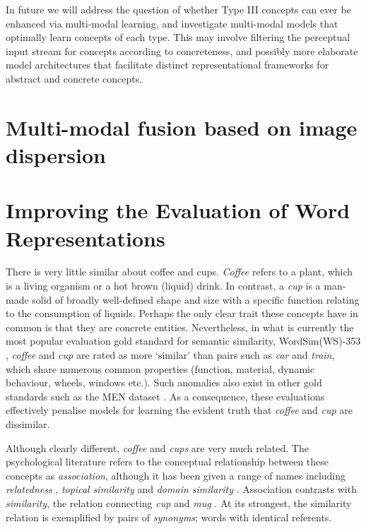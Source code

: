 In future we will address the question of whether Type III concepts can ever be enhanced via multi-modal learning, and investigate multi-modal models that optimally learn concepts of each type. This may involve filtering the perceptual input stream for concepts according to concreteness, and possibly more elaborate model architectures that facilitate distinct representational frameworks for abstract and concrete concepts.

 \section{Multi-modal fusion based on image dispersion}




\section{Improving the Evaluation of Word Representations}

There is very little similar about coffee and cups. \emph{Coffee} refers to a plant, which is a living organism or a hot brown (liquid) drink. In contrast, a \emph{cup} is a man-made solid of broadly well-defined shape and size with a specific function relating to the consumption of liquids. Perhaps the only clear trait these concepts have in common is that they are concrete entities. Nevertheless, in what is currently the most popular evaluation gold standard for semantic similarity, WordSim(WS)-353 \cite{finkelstein2001placing}, \emph{coffee} and \emph{cup} are rated  as more `similar' than pairs such as \emph{car} and \emph{train}, which share numerous common properties (function, material, dynamic behaviour, wheels, windows etc.). Such anomalies also exist in other gold standards such as the MEN dataset \cite{bruni2012distributional}. As a consequence, these evaluations effectively penalise models for learning the evident truth that \emph{coffee} and \emph{cup} are dissimilar. 

Although clearly different, \emph{coffee} and \emph{cups} are very much related. The psychological literature refers to the conceptual relationship between these concepts as \emph{association}, although it has been given a range of names including \emph{relatedness} \cite{budanitsky2006evaluating,agirre2009study}, \emph{topical similarity} \cite{hatzivassiloglou2001simfinder} and \emph{domain similarity} \cite{turney2012domain}. Association contrasts with \emph{similarity}, the relation connecting \emph{cup} and \emph{mug} \cite{tversky1977features}. At its strongest, the similarity relation is exemplified by pairs of \emph{synonyms}; words with identical referents.

